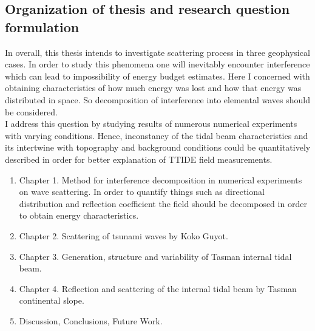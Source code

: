 \subsection{Organization of thesis and research question formulation}
In overall, this thesis intends to investigate scattering process in three geophysical cases. In order to study this phenomena one will inevitably encounter interference which can lead to impossibility of energy budget estimates. Here I concerned with obtaining characteristics of how much energy was lost and how that energy was distributed in space. So decomposition of interference into elemental waves should be considered.\\
I address this question by studying results of numerous numerical experiments with varying conditions. Hence, inconstancy of the tidal beam characteristics and its intertwine with topography and background conditions could be quantitatively described in order for better explanation of TTIDE field measurements.
 
\begin{enumerate}
\item Chapter 1. Method for interference decomposition in numerical experiments on wave scattering.
In order to quantify things such as directional distribution and reflection coefficient the field should be decomposed in order to obtain energy characteristics.

\item Chapter 2. Scattering of tsunami waves by Koko Guyot.
\item Chapter 3. Generation, structure and variability of Tasman internal tidal beam.
\item Chapter 4. Reflection and scattering of the internal tidal beam by Tasman continental slope.
\item Discussion, Conclusions, Future Work.
\end{enumerate}

\newpage




